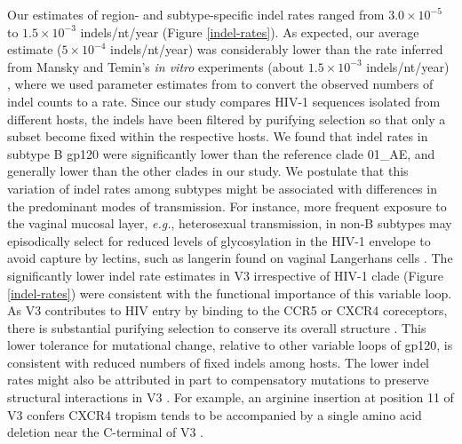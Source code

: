 \documentclass[12pt]{article}
\begin{document}
Our estimates of region- and subtype-specific indel rates ranged from $3.0\times 10^{-5}$ to $1.5\times 10^{-3}$ indels/nt/year (Figure \ref{indel-rates}). 
As expected, our average estimate ($5\times 10^{-4}$ indels/nt/year) was considerably lower than the rate inferred from Mansky and Temin's \textit{in vitro} experiments (about $1.5\times 10^{-3}$ indels/nt/year) \citep{Mansky:1995} , where we used parameter estimates from \citet{Perelson:1999} to convert the observed numbers of indel counts to a rate.
Since our study compares HIV-1 sequences isolated from different hosts, the indels have been filtered by purifying selection so that only a subset become fixed within the respective hosts.
We found that indel rates in subtype B gp120 were significantly lower than the reference clade 01\_AE, and generally lower than the other clades in our study.
We postulate that this variation of indel rates among subtypes might be associated with differences in the predominant modes of transmission.
For instance, more frequent exposure to the vaginal mucosal layer, \textit{e.g.}, heterosexual transmission, in non-B subtypes may episodically select for reduced levels of glycosylation in the HIV-1 envelope to avoid capture by lectins, such as langerin found on vaginal Langerhans cells \citep{joseph2015bottlenecks, lederman2006microbicides, Hladik:2009}.
The significantly lower indel rate estimates in V3 irrespective of HIV-1 clade (Figure \ref{indel-rates}) were consistent with the functional importance of this variable loop. 
As V3 contributes to HIV entry by binding to the CCR5 or CXCR4 coreceptors, there is substantial purifying selection to conserve its overall structure \citep{Liang:1999, Jiang:2010}. 
This lower tolerance for mutational change, relative to other variable loops of gp120, is consistent with reduced numbers of fixed indels among hosts. 
The lower indel rates might also be attributed in part to compensatory mutations to preserve structural interactions in V3 \citep{poon2007evolutionary}.
For example, an arginine insertion at position 11 of V3 confers CXCR4 tropism tends to be accompanied by a single amino acid deletion near the C-terminal of V3 \citep{Tsuchiya:2013}.




\end{document}
